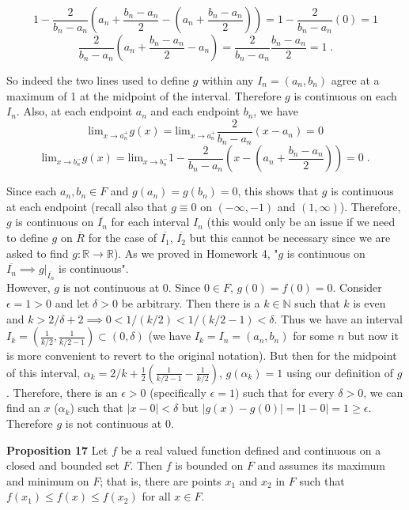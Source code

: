 \documentclass[a4paper]{article}
\begin{document}
$$1- \frac{2}{b_n-a_n}\left(a_n + \frac{b_n-a_n}{2} - \left(a_n + \frac{b_n-a_n}{2}\right)\right) = 1- \frac{2}{b_n-a_n}(0) = 1$$
$$\frac{2}{b_n-a_n}\left(a_n + \frac{b_n-a_n}{2} - a_n\right) = \frac{2}{b_n-a_n}\frac{b_n-a_n}{2}  = 1 \;.$$

So indeed the two lines used to define $g$ within any $I_n = (a_n,b_n)$ agree at a maximum of 1 at the midpoint of the interval. Therefore $g$ is continuous on each $I_n$. Also, at each endpoint $a_n$ and each endpoint $b_n$, we have
$$\text{lim}_{x \rightarrow a_n^+} g(x) = \text{lim}_{x\rightarrow a_n^+} \frac{2}{b_n - a_n}(x-a_n) = 0$$
$$ \text{lim}_{x\rightarrow b_n^-} g(x) = \text{lim}_{x\rightarrow b_n^-} 1 - \frac{2}{b_n - a_n}\left(x- (a_n + \frac{b_n-a_n}{2})\right) = 0 \;.$$

Since each $a_n,b_n \in F$ and $g(a_n) = g(b_n) = 0$, this shows that $g$ is continuous at each endpoint (recall also that $g \equiv 0$ on $(-\infty,-1)$ and $(1,\infty)$). Therefore, $g$ is continuous on $\overline{I_n}$ for each interval $I_n$ (this would only be an issue if we need to define $g$ on $\overline{R}$ for the case of $\overline{I_1}$, $\overline{I_2}$ but  this cannot be necessary since we are asked to find $g: \mathbb{R} \rightarrow \mathbb{R}$). As we proved in Homework 4, "$g$ is continuous on $\overline{I_n} \implies g\rvert_{\overline{I_n}}$ is continuous". \\

However, $g$ is not continuous at 0. Since $0 \in F$, $g(0) = f(0) = 0$. Consider $\epsilon = 1>0$ and let $\delta >0$ be arbitrary. Then there is a $k \in \mathbb{N}$ such that $k$ is even and  $k > 2/\delta + 2 \implies 0< 1/(k/2)< 1/(k/2 - 1) < \delta$. Thus we have an interval $I_k = \left(\frac{1}{k/2}, \frac{1}{k/2 - 1}\right) \subset (0,\delta)$ (we have $I_k = I_n= (a_n,b_n)$ for some $n$ but now it is more convenient to revert to the original notation). But then for the midpoint of this interval, $\alpha_k = 2/k + \frac{1}{2}\left(\frac{1}{k/2 - 1} - \frac{1}{k/2}\right)$, $g(\alpha_k)= 1$ using our definition of $g$. Therefore, there is an $\epsilon > 0$ (specifically $\epsilon = 1$) such that for every $\delta > 0$, we can find an $x$ ($\alpha_k$) such that $|x - 0| < \delta$ but $|g(x) - g(0)| = |1-0| = 1 \geq \epsilon$. Therefore $g$ is not continuous at $0$.

{\bf Proposition 17} Let $f$ be a real valued function defined and continuous on a closed and bounded set $F$. Then $f$ is bounded on $F$ and assumes its maximum and minimum on $F$; that is, there are points $x_1$ and $x_2$ in $F$ such that $f(x_1) \leq f(x) \leq f(x_2)$ for all $x \in F$.\\
\end{document}
